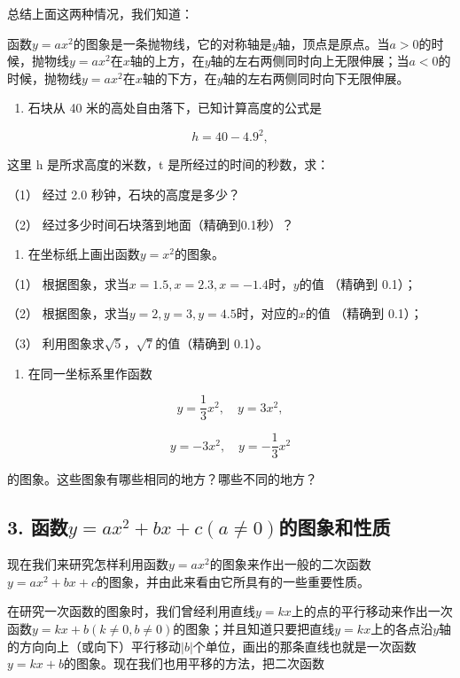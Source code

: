 总结上面这两种情况，我们知道：

函数\(y = ax^2\)的图象是一条抛物线，它的对称轴是\(y\)轴，顶点是原点。当\(a > 0\)的时候，抛物线\(y = ax^2\)在\(x\)轴的上方，在\(y\)轴的左右两侧同时向上无限伸展；当\(a < 0\)的时候，抛物线\(y = ax^2\)在\(x\)轴的下方，在\(y\)轴的左右两侧同时向下无限伸展。

\begin{enumerate}
\item
  石块从 40 米的高处自由落下，已知计算高度的公式是
\end{enumerate}

\[
h = 40 - 4.9^{2},
\]

这里 h 是所求高度的米数，t 是所经过的时间的秒数，求：

（1） 经过 2.0 秒钟，石块的高度是多少？

（2） 经过多少时间石块落到地面（精确到0.1秒）？

\begin{enumerate}[start=2]
\item
  在坐标纸上画出函数\(y = x^2\)的图象。
\end{enumerate}

（1） 根据图象，求当\(x = 1.5, x = 2.3, x = -1.4\)时，\(y\)的值 （精确到
0.1）；

（2） 根据图象，求当\(y = 2, y = 3, y = 4.5\)时，对应的\(x\)的值
（精确到 0.1）；

（3） 利用图象求\(\sqrt{5}\)，\(\sqrt{7}\)的值（精确到 0.1）。

\begin{enumerate}[start=3]
\item
  在同一坐标系里作函数
\end{enumerate}

\[
y = \frac{1}{3} x^{2}, \quad y = 3 x^{2},
\]

\[
y = - 3 x^{2}, \quad y = - \frac{1}{3} x^{2}
\]

的图象。这些图象有哪些相同的地方？哪些不同的地方？

\subsection{\texorpdfstring{3. 函数\(y = ax^2 + bx + c (a \neq 0)\)的图象和性质}{3. 函数y = ax\^{}2 + bx + c (a \textbackslash neq 0)的图象和性质}}

现在我们来研究怎样利用函数\(y = ax^2\)的图象来作出一般的二次函数\(y = ax^2 + bx + c\)的图象，并由此来看由它所具有的一些重要性质。

在研究一次函数的图象时，我们曾经利用直线\(y = kx\)上的点的平行移动来作出一次函数\(y = kx + b (k \neq 0, b \neq 0)\)的图象；并且知道只要把直线\(y = kx\)上的各点沿\(y\)轴的方向向上（或向下）平行移动\(|b|\)个单位，画出的那条直线也就是一次函数\(y = kx + b\)的图象。现在我们也用平移的方法，把二次函数

